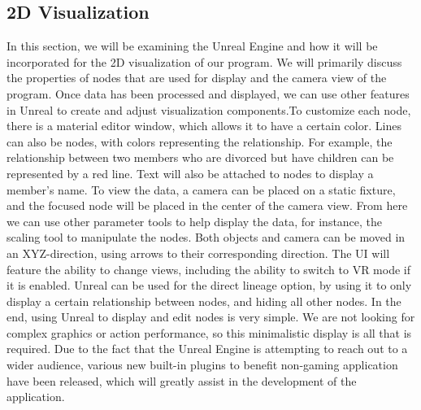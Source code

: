 \documentclass[onecolumn, draftclsnofoot, 10pt, compsoc]{IEEEtran}
\begin{document}
\subsection{2D Visualization}
\begin{singlespace}
In this section, we will be examining the Unreal Engine and how it will be incorporated for the 2D visualization of our program. We will primarily discuss the properties of nodes that are used for display and the camera view of the program.
\newline
\newline
Once data has been processed and displayed, we can use other features in Unreal to create and adjust visualization components.To customize each node, there is a material editor window, which allows it to have a certain color. Lines can also be nodes, with colors representing the relationship. For example, the relationship between two members who are divorced but have children can be represented by a red line. Text will also be attached to nodes to display a member’s name. 
\newline
\newline
To view the data, a camera can be placed on a static fixture, and the focused node will be placed in the center of the camera view. From here we can use other parameter tools to help display the data, for instance, the scaling tool to manipulate the nodes. Both objects and camera can be moved in an XYZ-direction, using arrows to their corresponding direction.
\newline
\newline
The UI will feature the ability to change views, including the ability to switch to VR mode if it is enabled. Unreal can be used for the direct lineage option, by using it to only display a certain relationship between nodes, and hiding all other nodes.
\newline
\newline
In the end, using Unreal to display and edit nodes is very simple. We are not looking for complex graphics or action performance, so this minimalistic display is all that is required. Due to the fact that the Unreal Engine is attempting to reach out to a wider audience, various new built-in plugins to benefit non-gaming application have been released, which will greatly assist in the development of the application.

\end{singlespace}
\end{document}
